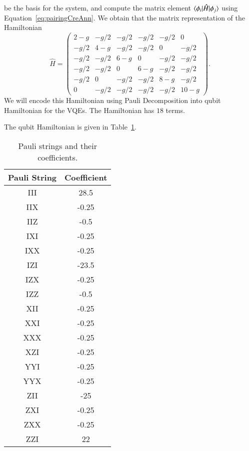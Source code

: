 be the basis for the system, and compute the matrix element $ \braket{\phi_i|\hat H|\phi_j} $ using Equation~\eqref{eq:pairingCreAnn}. We obtain that the matrix representation of the Hamiltonian
\begin{equation}
    \label{eq:pairing-mat}
	\hat{H}= \begin{pmatrix} 
	2-g & -g / 2 & -g / 2 & -g / 2 & -g / 2 & 0 \\
	-g / 2 & 4-g & -g / 2 & -g / 2 & 0 & -g / 2 \\
	-g / 2 & -g / 2 & 6-g & 0 & -g / 2 & -g / 2 \\
	-g / 2 & -g / 2 & 0 & 6-g & -g / 2 & -g / 2 \\
	-g / 2 & 0 & -g / 2 & -g / 2 & 8-g & -g / 2 \\
	0 & -g / 2 & -g / 2 & -g / 2 & -g / 2 & 10-g
	 \end{pmatrix}.
\end{equation}
We will encode this Hamiltonian using Pauli Decomposition into qubit Hamiltonian for the VQEs. The Hamiltonian has $ 18 $ terms.

The qubit Hamiltonian is given in Table~\ref{tab:pairing-qh}.

\begin{table}[ht]
    \centering
    \begin{tabular}{cc}
        \toprule
        \textbf{Pauli String} & \textbf{Coefficient} \\ 
        \midrule
        III & 28.5 \\ 
        IIX & -0.25 \\ 
        IIZ & -0.5 \\ 
        IXI & -0.25 \\ 
        IXX & -0.25 \\ 
        IZI & -23.5 \\ 
        IZX & -0.25 \\ 
        IZZ & -0.5 \\ 
        XII & -0.25 \\ 
        XXI & -0.25 \\ 
        XXX & -0.25 \\ 
        XZI & -0.25 \\ 
        YYI & -0.25 \\ 
        YYX & -0.25 \\ 
        ZII & -25 \\ 
        ZXI & -0.25 \\ 
        ZXX & -0.25 \\ 
        ZZI & 22 \\ 
        \bottomrule
    \end{tabular}
    \caption{Pauli strings and their coefficients.}
    \label{tab:pairing-qh}
\end{table}


